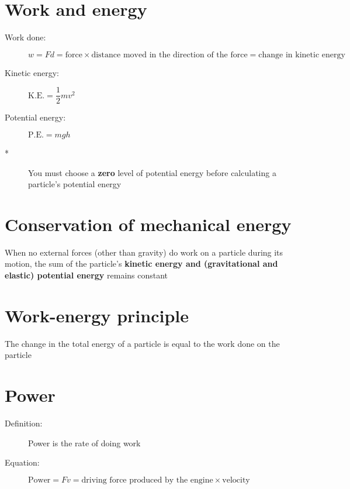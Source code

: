 \section{Work and energy}
\begin{description}
    \item[Work done:] $w=Fd=\text{force}\times\text{distance moved in the direction of the force}=\text{change in kinetic energy}$
    \item[Kinetic energy:] $\text{K.E.}=\dfrac{1}{2}mv^2$
    \item[Potential energy:] $\text{P.E.}=mgh$
    \item[*] You must choose a \textbf{zero} level of potential energy before calculating a particle's potential energy
\end{description}



\section{Conservation of mechanical energy}
When no external forces (other than gravity) do work on a particle during its motion, the sum of the particle's \textbf{kinetic energy and (gravitational and elastic) potential energy} remains constant

\section{Work-energy principle}
The change in the total energy of a particle is equal to the work done on the particle

\section{Power}
\begin{description}
    \item[Definition:] Power is the rate of doing work
    \item[Equation:] $\text{Power}=Fv=\text{driving force produced by the engine}\times\text{velocity}$
\end{description}